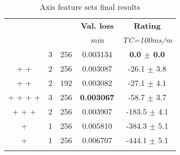 
    \begin{table}[H]
\caption{Axis feature sets final results}
\centering
\begin{adjustbox}{center}
\begin{tabular}{@{} ccccc @{}}
\toprule
\bf {} & \bf {} & \bf {} & \bf Val. loss  & \bf Rating \\
 &  &  & \textit{min}  & \textit{TC=100ms/m} \\
\midrule
     & 3 & 256 & 0.003134 & \bf0.0 $\pm$ 0.0\\
 +  +  & 2 & 256 & 0.003087 & -26.1 $\pm$ 3.8\\
 +  +  & 2 & 192 & 0.003082 & -27.1 $\pm$ 4.1\\
 +  +  +  +  & 3 & 256 & \bf0.003067 & -58.7 $\pm$ 3.7\\
 +  +  +  & 2 & 256 & 0.003907 & -183.5 $\pm$ 4.1\\
 +  & 1 & 256 & 0.005810 & -384.3 $\pm$ 5.1\\
 +  & 1 & 256 & 0.006707 & -444.1 $\pm$ 5.1\\
\toprule
{} \\
\end{tabular}
\end{adjustbox}
\end{table}
